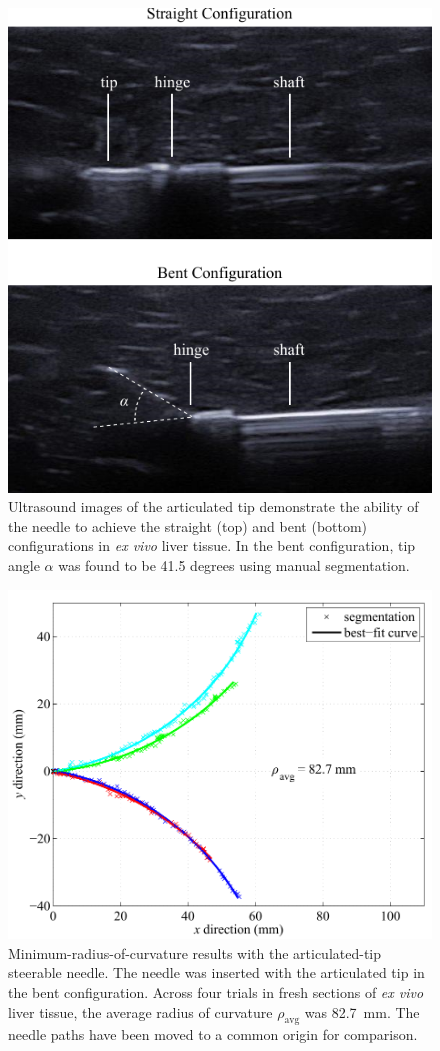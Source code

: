 \begin{figure}[!t]
\centering
\includegraphics[width = 0.65\columnwidth]{Images/Chapter3/ArticulatedTipUS/ArticulatedTipUS}%
\caption[Ultrasound images of the articulated tip]{Ultrasound images of the articulated tip demonstrate the ability of the needle to achieve the straight (top) and bent (bottom) configurations in \textit{ex vivo} liver tissue. In the bent configuration, tip angle $\alpha$ was found to be 41.5 degrees using manual segmentation.}
\label{fig:ArticulatedTipUS}
\end{figure}

\begin{figure}[!t]
\centering
\includegraphics[width=0.75\columnwidth]{Images/Chapter3/ArticulatedTipMaxCurvature/ArticulatedTipMaxCurvature}
\caption[Minimum-$\rho$ results with the articulated-tip needle]{Minimum-radius-of-curvature results with the articulated-tip steerable needle. The needle was inserted with the articulated tip in the bent configuration. Across four trials in fresh sections of \textit{ex vivo} liver tissue, the average radius of curvature $\rho_{\text{avg}}$ was 82.7~mm. The needle paths have been moved to a common origin for comparison.}
\label{fig:ArticulatedMaxCurvature}
\end{figure}  

